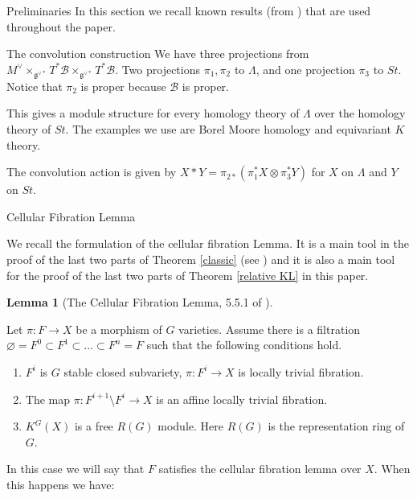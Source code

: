 \documentclass[12pt]{article}
\newcommand{\B}{\mathcal{B}}
\newcommand{\<}{\langle}
\renewcommand{\>}{\rangle}
\renewcommand{\emptyset}{\varnothing}
\theoremstyle{plain}
\theoremstyle{definition}
\newtheorem{lemma}[theorem]{Lemma}
\begin{document}
\begin{section}{Preliminaries}\label{s2}
In this section we recall known results (from \cite{Chriss1997RepresentationTA}) that are used throughout the paper.

\begin{subsection}{The convolution construction}\label{convultion}
    We have three projections  from $M^\vee\times_{\mathfrak{g}^{\vee*}}T^*\B\times_{\mathfrak{g}^{\vee*}}T^*\B$. Two projections $\pi_1,\pi_2$ to $\Lambda$, and one projection $\pi_3$ to $St$. Notice that $\pi_2$ is proper because $\B$ is proper.

    This gives a module structure for every homology theory of $\Lambda$ over the homology theory of $St$. The examples we use are Borel Moore homology and equivariant $K$ theory. 

    The convolution action is given by $X*Y=\pi_{2*}(\pi_1^*X\otimes \pi^*_3Y)$ for $X$ on $\Lambda$ and $Y$ on $St$.
\end{subsection}

\begin{subsection}{Cellular Fibration Lemma}

We recall the formulation of the cellular fibration Lemma. It is a main tool in the proof of the last two parts of Theorem \ref{classic} (see \cite{Chriss1997RepresentationTA}) and it is also a main tool for the proof of the last two parts of Theorem \ref{relative KL} in this paper.

\begin{lemma}[The Cellular Fibration Lemma, 5.5.1 of \cite{Chriss1997RepresentationTA}]\label{cfl}

Let $\pi:F\rightarrow X$ be a morphism of $G$ varieties. Assume there is a filtration $\emptyset=F^0\subset F^1\subset ...\subset F^n=F$ such that the following conditions hold.

\begin{enumerate}
    \item $F^i$ is $G$ stable closed subvariety, $\pi:F^i\rightarrow X$ is locally trivial fibration.
    \item  The map $\pi:F^{i+1}\setminus F^i\rightarrow X$ is an affine locally trivial fibration.
    \item $K^G(X)$ is a free $R(G)$ module. Here $R(G)$ is the representation ring of $G$.
\end{enumerate}

In this case we will say that $F$ satisfies the cellular fibration lemma over $X$. When this happens we have:


\end{lemma}
\end{subsection}
\end{section}
\end{document}
